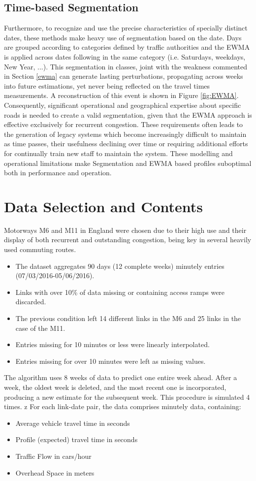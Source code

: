 \documentclass[a4paper, 10pt, conference]{ieeeconf}      %
\begin{document}
\subsection{Time-based Segmentation}\label{segmentation}
Furthermore, to recognize and use the precise characteristics of specially distinct dates, these methods make heavy use of segmentation based on the date. 
Days are grouped according to categories defined by traffic authorities and the EWMA is applied across dates following in the same category (i.e. Saturdays, weekdays, New Year, ...).
This segmentation in classes, joint with the weakness commented in Section \ref{ewma} can generate lasting perturbations, propagating across weeks into future estimations, yet never being reflected on the travel times measurements. A reconstruction of this event is shown in Figure \ref{fig:EWMA}.
Consequently, significant operational and geographical expertise about specific roads is needed to create a valid segmentation, given that the EWMA approach is effective exclusively for recurrent congestion. 
These requirements often leads to the generation of legacy systems which become increasingly difficult to maintain as time passes, their usefulness declining over time or requiring additional efforts for continually train new staff to maintain the system.
These modelling and operational limitations make Segmentation and EWMA based profiles suboptimal both in performance and operation.
\section{Data Selection and Contents}
Motorways M6 and M11 in England were chosen due to their high use and their display of both recurrent and outstanding congestion, being key in several heavily used commuting routes. 
\begin{itemize}
	\item The dataset aggregates 90 days (12 complete weeks) minutely entries (07/03/2016-05/06/2016).
	\item Links with over 10\% of data missing or containing access ramps were discarded.
	\item The previous condition left 14 different links in the M6 and 25 links in the case of the M11.
	\item Entries missing for 10 minutes or less were linearly interpolated.
	\item Entries missing for over 10 minutes were left as missing values.
\end{itemize}
The algorithm uses 8 weeks of data to predict one entire week ahead.
After a week, the oldest week is deleted, and the most recent one is incorporated, producing a new estimate for the subsequent week.
This procedure is simulated 4 times.
z
For each link-date pair, the data comprises minutely data, containing:
\begin{itemize}
	\item Average vehicle travel time in seconds
	\item Profile (expected) travel time in seconds
	\item Traffic Flow in cars/hour
	\item Overhead Space in meters
\end{itemize}
\end{document}
